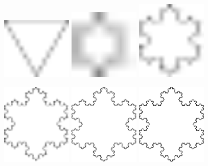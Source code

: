 \documentclass[11pt]{article}
\begin{document}
\begin{figure}[H]
  \centering

  \hfill
  \includegraphics[width=0.3\textwidth]{../images/koch-island-00.pdf}
  \hfill
  \includegraphics[width=0.3\textwidth]{../images/koch-island-01.pdf}
  \hfill
  \includegraphics[width=0.3\textwidth]{../images/koch-island-02.pdf}
  \hfill

  \hfill
  \includegraphics[width=0.3\textwidth]{../images/koch-island-03.pdf}
  \hfill
  \includegraphics[width=0.3\textwidth]{../images/koch-island-04.pdf}
  \hfill
  \includegraphics[width=0.3\textwidth]{../images/koch-island-05.pdf}
  \hfill


\end{figure}
\end{document}
